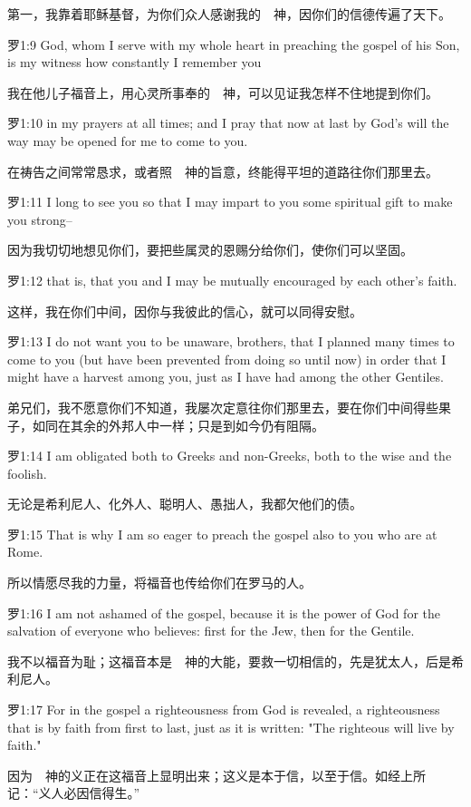 \documentclass[a4paper,11pt,onecolumn,twoside]{ctexart}
\begin{document}
\begin{multicols}{2}
 第一，我靠着耶稣基督，为你们众人感谢我的　神，因你们的信德传遍了天下。


 罗1:9
 God, whom I serve with my whole heart in preaching the gospel of his Son, is my witness how constantly I remember you

 我在他儿子福音上，用心灵所事奉的　神，可以见证我怎样不住地提到你们。


 罗1:10
 in my prayers at all times; and I pray that now at last by God's will the way may be opened for me to come to you.

 在祷告之间常常恳求，或者照　神的旨意，终能得平坦的道路往你们那里去。


 罗1:11
 I long to see you so that I may impart to you some spiritual gift to make you strong--

 因为我切切地想见你们，要把些属灵的恩赐分给你们，使你们可以坚固。


 罗1:12
 that is, that you and I may be mutually encouraged by each other's faith.

 这样，我在你们中间，因你与我彼此的信心，就可以同得安慰。


 罗1:13
 I do not want you to be unaware, brothers, that I planned many times to come to you (but have been prevented from doing so until now) in order that I might have a harvest among you, just as I have had among the other Gentiles.

 弟兄们，我不愿意你们不知道，我屡次定意往你们那里去，要在你们中间得些果子，如同在其余的外邦人中一样；只是到如今仍有阻隔。


 罗1:14
 I am obligated both to Greeks and non-Greeks, both to the wise and the foolish.

 无论是希利尼人、化外人、聪明人、愚拙人，我都欠他们的债。


 罗1:15
 That is why I am so eager to preach the gospel also to you who are at Rome.

 所以情愿尽我的力量，将福音也传给你们在罗马的人。


 罗1:16
 I am not ashamed of the gospel, because it is the power of God for the salvation of everyone who believes: first for the Jew, then for the Gentile.

 我不以福音为耻；这福音本是　神的大能，要救一切相信的，先是犹太人，后是希利尼人。


 罗1:17
 For in the gospel a righteousness from God is revealed, a righteousness that is by faith from first to last, just as it is written: "The righteous will live by faith."

 因为　神的义正在这福音上显明出来；这义是本于信，以至于信。如经上所记：“义人必因信得生。”



\end{multicols}
\end{document}

